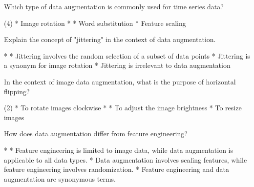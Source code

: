 \documentclass[11pt]{extarticle}
\begin{document}
\begin{exercise}
    Which type of data augmentation is commonly used for time series data?
    \begin{choice}(4)
        * Image rotation
        * 
        * Word substitution
        * Feature scaling
    \end{choice}
\end{exercise}
\begin{solution}
\end{solution}

\begin{exercise}
    Explain the concept of "jittering" in the context of data augmentation.
    \begin{choice}
        * 
        * Jittering involves the random selection of a subset of data points
        * Jittering is a synonym for image rotation
        * Jittering is irrelevant to data augmentation
    \end{choice}
\end{exercise}
\begin{solution}
\end{solution}

\begin{exercise}
    In the context of image data augmentation, what is the purpose of horizontal flipping?
    \begin{choice} (2)
        * To rotate images clockwise
        * 
        * To adjust the image brightness
        * To resize images
    \end{choice}
\end{exercise}
\begin{solution}
\end{solution}

\begin{exercise}
    How does data augmentation differ from feature engineering?
    \begin{choice}
        * 
        * Feature engineering is limited to image data, while data augmentation is applicable to all data types.
        * Data augmentation involves scaling features, while feature engineering involves randomization.
        * Feature engineering and data augmentation are synonymous terms.
    \end{choice}
\end{exercise}
\begin{solution}
\end{solution}
\end{document}
